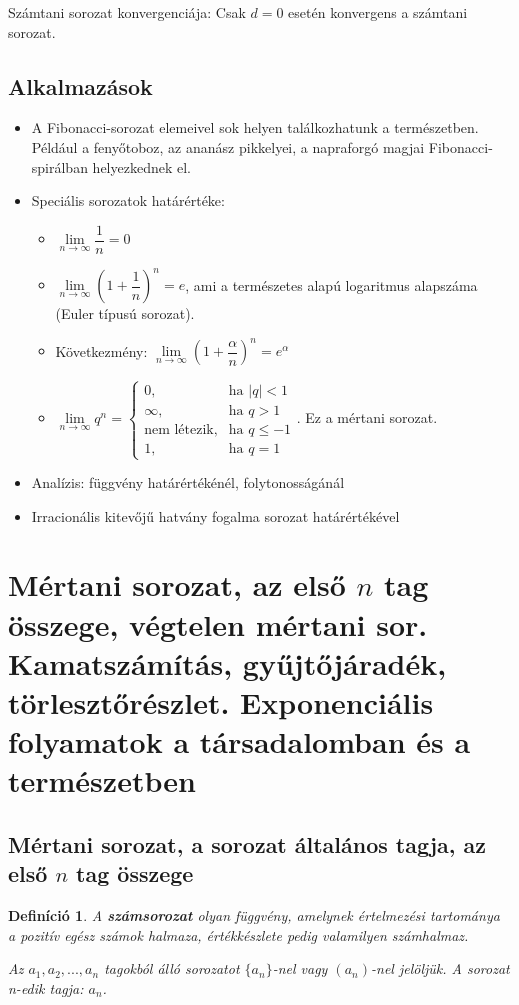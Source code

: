 \documentclass[12pt,a4paper]{article}
\newtheorem{definition}{Definíció} [section]
\begin{document}
Számtani sorozat konvergenciája: Csak $d = 0$ esetén konvergens a számtani sorozat.

\subsection{Alkalmazások}
\begin{itemize}
\item A Fibonacci-sorozat elemeivel sok helyen találkozhatunk a természetben. Például a fenyőtoboz, az ananász pikkelyei, a napraforgó magjai Fibonacci-spirálban helyezkednek el.
\item  Speciális sorozatok határértéke:
\begin{itemize}
\item $\lim\limits_{n\to \infty}\dfrac{1}{n}=0$
\item $\lim\limits_{n\to \infty}\left(1+\dfrac{1}{n} \right)^n=e$, ami a természetes alapú logaritmus alapszáma (Euler típusú sorozat).
\item Következmény: $\lim\limits_{n\to \infty}\left(1+\dfrac{\alpha}{n} \right)^n=e^\alpha$
\item $\lim\limits_{n\to \infty} q^n=\begin{cases} 0, & \text{ha } |q|<1 \\ \infty, & \text{ha } q>1 \\ \text{nem létezik}, & \text{ha } q\leq -1 \\ 1, & \text{ha }q=1 \end{cases}$. Ez a mértani sorozat.
\end{itemize}
\item Analízis: függvény határértékénél, folytonosságánál
\item Irracionális kitevőjű hatvány fogalma sorozat határértékével
\end{itemize}
\newpage






\section{Mértani sorozat, az első $n$ tag összege, végtelen mértani sor. Kamatszámítás, gyűjtőjáradék, törlesztőrészlet. Exponenciális folyamatok a társadalomban és a természetben}
\subsection{Mértani sorozat, a sorozat általános tagja, az első $n$ tag összege}
\begin{definition}
A \textbf{számsorozat} olyan függvény, amelynek értelmezési tartománya a pozitív egész számok halmaza, értékkészlete pedig valamilyen számhalmaz.

Az $a_1, a_2, ..., a_n$ tagokból álló sorozatot $\{a_n\}$-nel vagy $(a_n)$-nel jelöljük. A sorozat n-edik tagja: $a_n$.
\end{definition}
\end{document}
